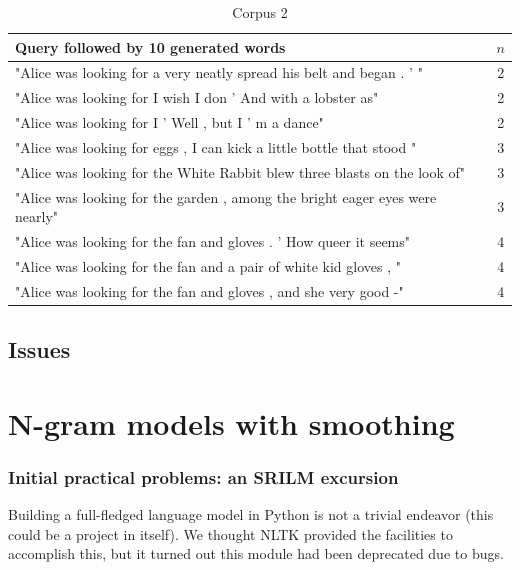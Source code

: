 \documentclass[a4paper,12pt]{article}
\begin{document}
\begin{table}[!h]
\small
\begin{tabular}{| l |c|}
\hline
Query followed by 10 generated words & $n$ \\ \hline
"Alice was looking for a very neatly spread his belt and began . ' " & 2\\ \hline
"Alice was looking for I wish I don ' And with a lobster as" & 2\\ \hline
"Alice was looking for I ' Well , but I ' m a dance" & 2\\ \hline
"Alice was looking for eggs , I can kick a little bottle that stood "& 3 \\ \hline
"Alice was looking for the White Rabbit blew three blasts on the look of"& 3 \\ \hline
"Alice was looking for the garden , among the bright eager eyes were nearly"& 3 \\ \hline
"Alice was looking for the fan and gloves . ' How queer it seems" & 4 \\ \hline
"Alice was looking for the fan and a pair of white kid gloves , " & 4 \\ \hline
"Alice was looking for the fan and gloves , and she very good -" & 4 \\ \hline
\end{tabular}
\caption{Corpus 2}
\label{tab:corpus2}
\end{table}


\subsection{Issues}

\section{N-gram models with smoothing}
\subsubsection{Initial practical problems: an SRILM excursion}
Building a full-fledged language model in Python is not a trivial endeavor (this could be a project in itself). We thought NLTK provided the facilities to accomplish this, but it turned out this module had been deprecated due to bugs. 
\end{document}
